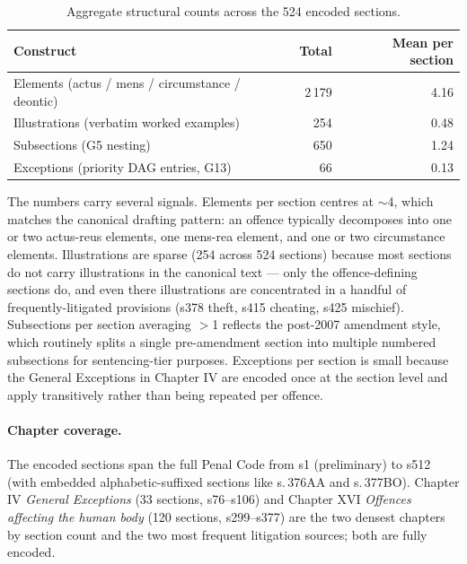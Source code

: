 \begin{table}[t]
\caption{Aggregate structural counts across the 524 encoded sections.}
\label{tab:struct}
\begin{small}
\begin{tabular}{@{}lrr@{}}
\toprule
\textbf{Construct} & \textbf{Total} & \textbf{Mean per section} \\ \midrule
Elements (actus / mens / circumstance / deontic) & 2\,179 & 4.16 \\
Illustrations (verbatim worked examples)         & \,\,\,\,254 & 0.48 \\
Subsections (\textsf{G5} nesting)                & \,\,\,\,650 & 1.24 \\
Exceptions (priority DAG entries, \textsf{G13})  & \,\,\,\,\,\,\,66 & 0.13 \\ \bottomrule
\end{tabular}
\end{small}
\end{table}

The numbers carry several signals. Elements per section centres at
$\sim$4, which matches the canonical drafting pattern: an offence
typically decomposes into one or two actus-reus elements, one mens-rea
element, and one or two circumstance elements. Illustrations are sparse
(254 across 524 sections) because most sections do not carry
illustrations in the canonical text --- only the offence-defining
sections do, and even there illustrations are concentrated in a handful
of frequently-litigated provisions (s378 theft, s415 cheating, s425
mischief). Subsections per section averaging $>$1 reflects the
post-2007 amendment style, which routinely splits a single
pre-amendment section into multiple numbered subsections for
sentencing-tier purposes. Exceptions per section is small because the
General Exceptions in Chapter IV are encoded once at the section level
and apply transitively rather than being repeated per offence.

\paragraph{Chapter coverage.} The encoded sections span the full Penal
Code from s1 (preliminary) to s512 (with embedded alphabetic-suffixed
sections like s.\,376AA and s.\,377BO). Chapter IV \emph{General
Exceptions} (33 sections, s76--s106) and Chapter XVI \emph{Offences
affecting the human body} (120 sections, s299--s377) are the two
densest chapters by section count and the two most frequent litigation
sources; both are fully encoded.

